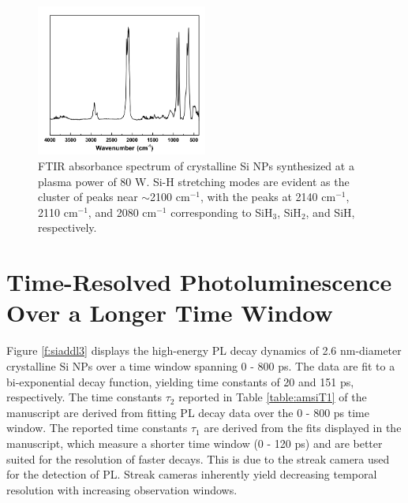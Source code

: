 \begin{figure}
\begin{center}
\includegraphics[width=0.5\textwidth]{./appendixC/siaddl2.png}
\caption[FTIR absorbance spectrum of plasma-synthesized, crystalline Si NPs.]{FTIR absorbance spectrum of crystalline Si NPs synthesized at a plasma power of 80 W. Si-H stretching modes are evident as the cluster of peaks near $\sim$2100 cm$^{-1}$, with the peaks at 2140 cm$^{-1}$, 2110 cm$^{-1}$, and 2080 cm$^{-1}$ corresponding to SiH$_3$, SiH$_2$, and
SiH, respectively.}
\label{f:siaddl2}
\end{center}
\end{figure}

\section{Time-Resolved Photoluminescence Over a Longer Time Window}
Figure \ref{f:siaddl3} displays the high-energy PL decay dynamics of 2.6 nm-diameter crystalline Si NPs over a time window spanning 0 - 800 ps. The data are fit to a bi-exponential decay function, yielding time constants of 20 and 151 ps, respectively. The time constants $\tau_2$ reported in Table \ref{table:amsiT1} of the manuscript are derived from fitting PL decay data over the 0 - 800 ps time window. The reported time constants $\tau_1$ are derived from the fits displayed in the manuscript, which measure a shorter time window (0 - 120 ps) and are better suited for the resolution of faster decays. This is due to the streak camera used for the detection of PL. Streak cameras inherently yield decreasing temporal resolution with increasing observation windows.

